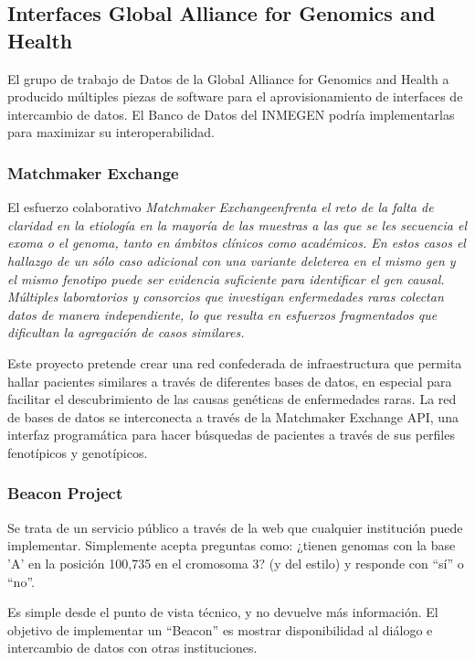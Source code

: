 \documentclass[
10pt, %
letterpaper, %
oneside, %
headinclude,footinclude, %
BCOR5mm, %
]{scrartcl}
\begin{document}
\subsection{Interfaces Global Alliance for Genomics and Health}

El grupo de trabajo de Datos de la Global Alliance for Genomics and
Health a producido múltiples piezas de software para el
aprovisionamiento de interfaces de intercambio de datos. El Banco de
Datos del INMEGEN podría implementarlas para maximizar su
interoperabilidad.

\subsubsection{Matchmaker Exchange}

El esfuerzo colaborativo \em{Matchmaker Exchange}\em  enfrenta el reto de la
falta de claridad en la etiología en la mayoría de las muestras a las
que se les secuencia el exoma o el genoma, tanto en ámbitos clínicos
como académicos. En estos casos el hallazgo de un sólo caso adicional
con una variante deleterea en el mismo gen y el mismo fenotipo puede
ser evidencia suficiente para identificar el gen causal. Múltiples
laboratorios y consorcios que investigan enfermedades raras colectan
datos de manera independiente, lo que resulta en esfuerzos
fragmentados que dificultan la agregación de casos similares.

Este proyecto pretende crear una red confederada de infraestructura
que permita hallar pacientes similares a través de diferentes bases de
datos, en especial para facilitar el descubrimiento de las causas
genéticas de enfermedades raras. La red de bases de datos se
interconecta a través de la Matchmaker Exchange API, una interfaz
programática para hacer búsquedas de pacientes a través de sus
perfiles fenotípicos y genotípicos.


\subsubsection{Beacon Project}
Se trata de un servicio público a través de la web que cualquier
institución puede implementar. Simplemente acepta preguntas como:
¿tienen genomas con la base 'A' en la posición 100,735 en el cromosoma
3? (y del estilo) y responde con ``sí'' o ``no''.

Es simple desde el punto de vista técnico, y no devuelve más
información. El objetivo de implementar un ``Beacon'' es mostrar
disponibilidad al diálogo e intercambio de datos con otras
instituciones.
\end{document}
